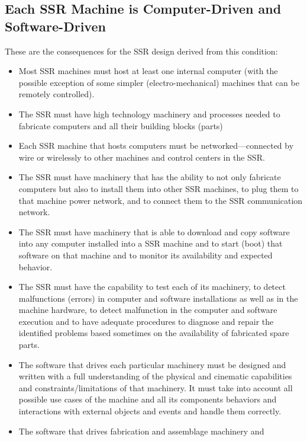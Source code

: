 \subsection[Each SSR Machine is Computer{}-Driven and
Software{}-Driven]{Each SSR Machine is Computer-Driven and
Software-Driven}

These are the consequences for
the SSR design derived from this condition:

\begin{itemize}
\item Most SSR machines must host at least one internal computer (with
the possible exception of some simpler (electro-mechanical) machines
that can be remotely controlled).
\item The SSR must have high technology machinery and processes needed
to fabricate computers and all their building blocks (parts)
\item Each SSR machine that hosts computers must be networked---connected 
by wire or wirelessly to other machines and control centers
in the SSR.
\item The SSR must have machinery that has the ability to not only
fabricate computers but also to install them into other SSR machines,
to plug them to that machine power network, and to connect them to
the SSR communication network.
\item The SSR must have machinery that is able to download and copy
software into any computer installed into a SSR machine and to start
(boot) that software on that machine and to monitor its availability
and expected behavior.
\item The SSR must have the capability to test each of its machinery, to
detect malfunctions (errors) in computer and software installations as
well as in the machine hardware, to detect malfunction in the computer
and software execution and to have adequate procedures to diagnose and
repair the identified problems based sometimes on the availability of
fabricated spare parts.
\item The software that drives each particular machinery must be
designed and written with a full understanding of the physical and
cinematic capabilities and constraints/limitations of that machinery.
It must take into account all possible use cases of the machine and all
its components behaviors and interactions with external objects and
events and handle them correctly.
\item The software that drives fabrication and assemblage machinery and

\end{itemize}
